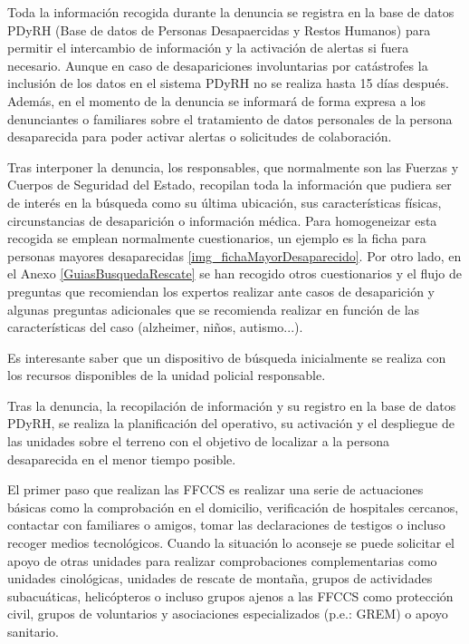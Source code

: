     Toda la información recogida durante la denuncia se registra en la base de datos PDyRH (Base de datos de Personas Desapaercidas y Restos Humanos) para permitir el intercambio de información y la activación de alertas si fuera necesario. Aunque en caso de desapariciones involuntarias por catástrofes la inclusión de los datos en el sistema PDyRH no se realiza hasta 15 días después. Además, en el momento de la denuncia se informará de forma expresa a los denunciantes o familiares sobre el tratamiento de datos personales de la persona desaparecida para poder activar alertas o solicitudes de colaboración.
    
    Tras interponer la denuncia, los responsables, que normalmente son las Fuerzas y Cuerpos de Seguridad del Estado, recopilan toda la información que pudiera ser de interés en la búsqueda como su última ubicación, sus características físicas, circunstancias de desaparición o información médica. Para homogeneizar esta recogida se emplean normalmente cuestionarios, un ejemplo es la ficha para personas mayores desaparecidas \ref{img_fichaMayorDesaparecido}. Por otro lado, en el Anexo \ref{GuiasBusquedaRescate} se han recogido otros cuestionarios y el flujo de preguntas que recomiendan los expertos realizar ante casos de desaparición y algunas preguntas adicionales que se recomienda realizar en función de las características del caso (alzheimer, niños, autismo...).
    
    
    

    Es interesante saber que un dispositivo de búsqueda inicialmente se realiza con los recursos disponibles de la unidad policial responsable.
    
    Tras la denuncia, la recopilación de información y su registro en la base de datos PDyRH, se realiza la planificación del operativo, su activación y el despliegue de las unidades sobre el terreno con el objetivo de localizar a la persona desaparecida en el menor tiempo posible. 
    
    El primer paso que realizan las FFCCS es realizar una serie de actuaciones básicas como la comprobación en el domicilio, verificación de hospitales cercanos, contactar con familiares o amigos, tomar las declaraciones de testigos o incluso recoger medios tecnológicos. Cuando la situación lo aconseje se puede solicitar el apoyo de otras unidades para realizar comprobaciones complementarias como unidades cinológicas, unidades de rescate de montaña, grupos de actividades subacuáticas, helicópteros o incluso grupos ajenos a las FFCCS como protección civil, grupos de voluntarios y asociaciones especializados (p.e.: GREM\cite{GREM}) o apoyo sanitario.
    
